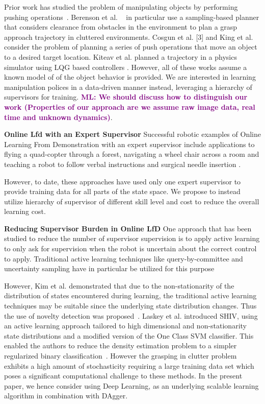 \documentclass[10pt, conference]{ieeeconf}      %
\newcommand{\mlnote}[1]{\ifthenelse{ \boolean{include-notes}}%
 {\textcolor{purple}{\textbf{ML: #1}}}{}}
\begin{document}
Prior work has studied the problem of manipulating objects
by performing pushing operations~\cite{}. Berenson et
al. ~\cite{} in particular use a sampling-based planner that considers clearance
from obstacles in the environment to plan a grasp
approach trajectory in cluttered environments. Cosgun et al.
[3] and King et al. \cite{kingnonprehensile} consider the problem of planning
a series of push operations that move an object to a
desired target location. Kiteav et al. planned a trajectory in a physics simulator using LQG based controllers
\cite{kitaevphysics}. However, all of these works assume a known model of of the object behavior is provided. We are
interested in learning manipulation polices in a data-driven manner instead, leveraging a hierarchy of supervisors for
training.  
\mlnote{We should discuss how to distinguish our work (Properties of our approach are we assume raw image data, real time and unknown dynamics)}. 

\noindent \textbf{Online Lfd with an Expert Supervisor}
Successful robotic examples of Online Learning From Demonstration with an expert supervisor include applications to flying a quad-copter through a forest, navigating a wheel chair across a room and teaching a robot to follow verbal instructions and surgical needle insertion \cite{ross2013learning, kim2013maximum, duvallet2013imitation, laskey}. 

However, to date, these approaches have used only one expert supervisor to provide training data for all parts of the
state space. We propose to instead utilize hierarchy of supervisor of different skill level and cost to reduce the
overall learning cost. 

\noindent\textbf{Reducing Supervisor Burden in Online LfD} One approach that has been studied to reduce the number of
supervisor supervision is to apply active learning to only ask for supervision when the robot is uncertain about the
correct control to apply. Traditional active learning techniques like query-by-committee and uncertainty sampling have
in particular be utilized for this purpose \cite{chernova2009interactive,judah2011active,grollman2007dogged}

However, Kim et al. demonstrated that due to the non-stationarity of the distribution of states encountered during
learning, the traditional active learning techniques may be suitable since the underlying state distribution changes.
Thus the use of novelty detection was proposed~\cite{kim2013maximum}. Laskey et al. introduced SHIV, using an active
learning approach tailored to high dimensional and non-stationarity state distributions and a modified version of the
One Class SVM classifier. This enabled the authors to reduce the density estimation problem to a 
simpler regularized binary classification~\cite{laskey}. However the grasping in clutter problem exhibits a high amount
of stochasticity requiring a large training data set which poses a significant computational challenge to these methods.
In the present paper, we hence consider using Deep Learning, as an underlying scalable learning algorithm in combination
with DAgger.
\end{document}

